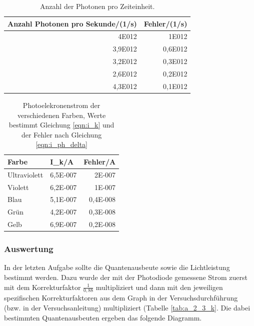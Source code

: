 \documentclass[12px]{scrartcl}
\begin{document}
\begin{table}[H]
\caption{Anzahl der Photonen pro Zeiteinheit.}
\begin{center}
\begin{tabular}{|r|r|}
\hline
\multicolumn{1}{|l|}{Anzahl Photonen pro Sekunde/(1/s)} & \multicolumn{1}{l|}{Fehler/(1/s)} \\ \hline
4E012 & 1E012 \\ \hline
3,9E012 & 0,6E012 \\ \hline
3,2E012 & 0,3E012 \\ \hline
2,6E012 & 0,2E012 \\ \hline
4,3E012 & 0,1E012 \\ \hline
\end{tabular}
\end{center}
\label{tab:a_2_3_a}
\end{table}

\begin{table}[H]
\caption{Photoelekronenstrom der verschiedenen Farben, Werte bestimmt Gleichung \ref{eqn:i_k} und der Fehler nach Gleichung \ref{eqn:i_ph_delta}}
\begin{center}
\begin{tabular}{|l|r|r|}
\hline
Farbe & \multicolumn{1}{l|}{I\_k/A} & \multicolumn{1}{l|}{Fehler/A} \\ \hline
Ultraviolett & 6,5E-007 & 2E-007 \\ \hline
Violett & 6,2E-007 & 1E-007 \\ \hline
Blau & 5,1E-007 & 0,4E-008 \\ \hline
Grün & 4,2E-007 & 0,3E-008 \\ \hline
Gelb & 6,9E-007 & 0,2E-008 \\ \hline
\end{tabular}
\end{center}
\label{tab:i_k}
\end{table}



\subsubsection{Auswertung}
In der letzten Aufgabe sollte die Quantenausbeute sowie die Lichtleistung bestimmt werden. Dazu wurde der mit der Photodiode gemessene Strom zuerst mit dem Korrekturfaktor $\frac{1}{0,88}$ multipliziert und dann mit den jeweiligen spezifischen Korrekturfaktoren aus dem Graph in der Versuchsdurchführung (bzw. in der Versuchsanleitung) multipliziert (Tabelle \ref{tab:a_2_3_k}. Die dabei bestimmten Quantenausbeuten ergeben das folgende Diagramm.
\end{document}
